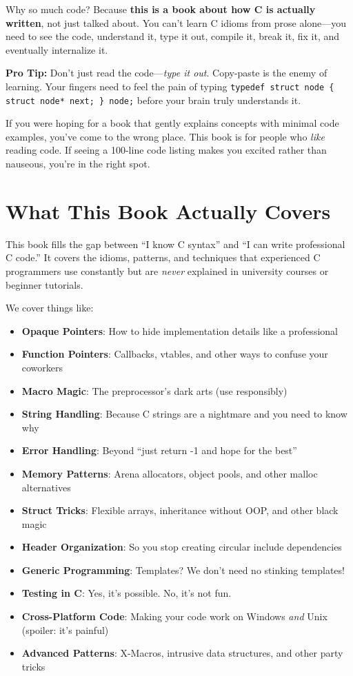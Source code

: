 \documentclass[11pt,openany]{book}
\begin{document}
Why so much code? Because \textbf{this is a book about how C is actually written}, not just talked about. You can't learn C idioms from prose alone---you need to see the code, understand it, type it out, compile it, break it, fix it, and eventually internalize it.

\begin{tipbox}
\textbf{Pro Tip:} Don't just read the code---\textit{type it out}. Copy-paste is the enemy of learning. Your fingers need to feel the pain of typing \texttt{typedef struct node \{ struct node* next; \} node;} before your brain truly understands it.
\end{tipbox}

If you were hoping for a book that gently explains concepts with minimal code examples, you've come to the wrong place. This book is for people who \textit{like} reading code. If seeing a 100-line code listing makes you excited rather than nauseous, you're in the right spot.

\section*{What This Book Actually Covers}

This book fills the gap between ``I know C syntax'' and ``I can write professional C code.'' It covers the idioms, patterns, and techniques that experienced C programmers use constantly but are \textit{never} explained in university courses or beginner tutorials.

We cover things like:
\begin{itemize}
    \item \textbf{Opaque Pointers}: How to hide implementation details like a professional
    \item \textbf{Function Pointers}: Callbacks, vtables, and other ways to confuse your coworkers
    \item \textbf{Macro Magic}: The preprocessor's dark arts (use responsibly)
    \item \textbf{String Handling}: Because C strings are a nightmare and you need to know why
    \item \textbf{Error Handling}: Beyond ``just return -1 and hope for the best''
    \item \textbf{Memory Patterns}: Arena allocators, object pools, and other malloc alternatives
    \item \textbf{Struct Tricks}: Flexible arrays, inheritance without OOP, and other black magic
    \item \textbf{Header Organization}: So you stop creating circular include dependencies
    \item \textbf{Generic Programming}: Templates? We don't need no stinking templates!
    \item \textbf{Testing in C}: Yes, it's possible. No, it's not fun.
    \item \textbf{Cross-Platform Code}: Making your code work on Windows \textit{and} Unix (spoiler: it's painful)
    \item \textbf{Advanced Patterns}: X-Macros, intrusive data structures, and other party tricks
\end{itemize}
\end{document}

